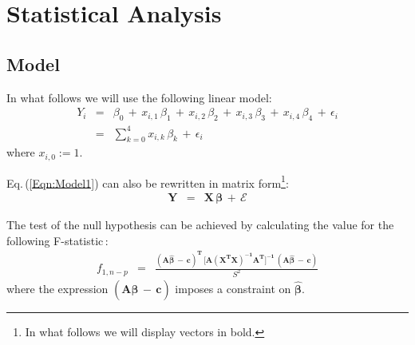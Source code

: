 \section{Statistical Analysis}

\subsection{Model}
In what follows we will use the following linear model:
\begin{eqnarray}
       Y_i & = & \beta_0 \, + \, x_{i,1}\,\beta_1 \,+\,
                 x_{i,2}\,\beta_2 \, + \,x_{i,3}\,\beta_3 \,+\,
                 x_{i,4}\,\beta_4 \, + \, \epsilon_i \nonumber \\
	   & = & \displaystyle \sum_{k=0}^4 x_{i,k}\,\beta_k \, + \, \epsilon_i \label{Eqn:Model1}		 
\end{eqnarray}
where $x_{i,0}:=1$.

Eq.\,(\ref{Eqn:Model1}) can also be rewritten in matrix form\footnote{In what follows we will display vectors in bold.}:
\begin{eqnarray}
        \boldsymbol{Y} & = & \boldsymbol{X} \, \boldsymbol{\beta} \, + \, \boldsymbol{\mathcal{E}} \label{Eqn:Model2}
\end{eqnarray}


The test of the null hypothesis can be achieved by calculating the value for the following F-statistic\,\cite{seber2012linear}:
\begin{eqnarray}
        f_{1,n-p} & = & \frac{ \boldsymbol{(A\widehat{\beta}\,-\,c)^T}  \,
                        \boldsymbol{\Bigg[ A(X^TX)^{-1}A^T \Bigg]^{-1} } \,
                          \boldsymbol{(A\widehat{\beta}\,-\,c)}
                         }{S^2} \label{Eq:Fstatistic}
\end{eqnarray}
where the expression $\boldsymbol{(A\widehat{\beta}\,-\,c)}$
imposes a constraint on $\boldsymbol{\widehat{\beta}}$.
